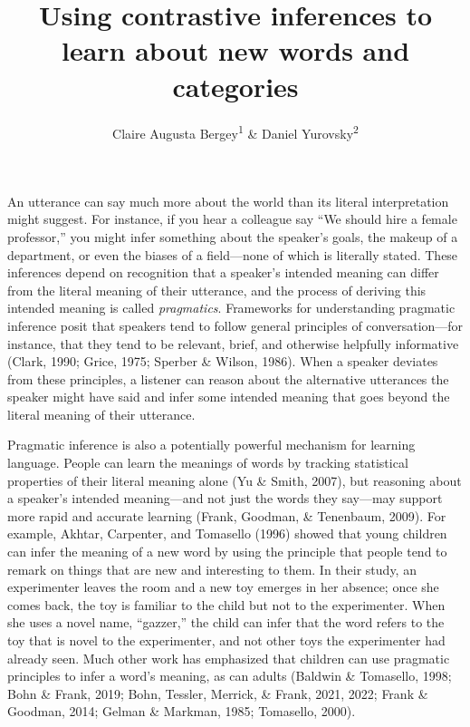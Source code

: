 \documentclass[
  english,
  man,floatsintext]{apa6}
\title{Using contrastive inferences to learn about new words and categories}
\author{Claire Augusta Bergey\textsuperscript{1} \& Daniel Yurovsky\textsuperscript{2}}
\date{}
\affiliation{\vspace{0.5cm}\textsuperscript{1} University of Chicago\\\textsuperscript{2} Carnegie Mellon University}
\begin{document}
\maketitle

An utterance can say much more about the world than its literal interpretation might suggest. For instance, if you hear a colleague say ``We should hire a female professor,'' you might infer something about the speaker's goals, the makeup of a department, or even the biases of a field---none of which is literally stated. These inferences depend on recognition that a speaker's intended meaning can differ from the literal meaning of their utterance, and the process of deriving this intended meaning is called \emph{pragmatics}. Frameworks for understanding pragmatic inference posit that speakers tend to follow general principles of conversation---for instance, that they tend to be relevant, brief, and otherwise helpfully informative (Clark, 1990; Grice, 1975; Sperber \& Wilson, 1986). When a speaker deviates from these principles, a listener can reason about the alternative utterances the speaker might have said and infer some intended meaning that goes beyond the literal meaning of their utterance.

Pragmatic inference is also a potentially powerful mechanism for learning language. People can learn the meanings of words by tracking statistical properties of their literal meaning alone (Yu \& Smith, 2007), but reasoning about a speaker's intended meaning---and not just the words they say---may support more rapid and accurate learning (Frank, Goodman, \& Tenenbaum, 2009). For example, Akhtar, Carpenter, and Tomasello (1996) showed that young children can infer the meaning of a new word by using the principle that people tend to remark on things that are new and interesting to them. In their study, an experimenter leaves the room and a new toy emerges in her absence; once she comes back, the toy is familiar to the child but not to the experimenter. When she uses a novel name, ``gazzer,'' the child can infer that the word refers to the toy that is novel to the experimenter, and not other toys the experimenter had already seen. Much other work has emphasized that children can use pragmatic principles to infer a word's meaning, as can adults (Baldwin \& Tomasello, 1998; Bohn \& Frank, 2019; Bohn, Tessler, Merrick, \& Frank, 2021, 2022; Frank \& Goodman, 2014; Gelman \& Markman, 1985; Tomasello, 2000).
\end{document}
